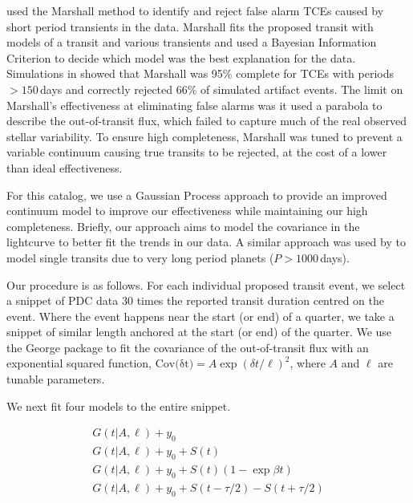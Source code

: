 
\citet{Coughlin2016} used the Marshall method \citep{Mullally16} to identify and reject false alarm TCEs caused by short period transients in the data. Marshall fits the proposed transit with models of a transit and various transients and used a Bayesian Information Criterion to decide which model was the best explanation for the data. Simulations in \citet{Mullally16} showed that Marshall was 95\% complete for TCEs with periods $>150$\,days and correctly rejected 66\% of simulated artifact events. The limit on Marshall's effectiveness at eliminating false alarms was it used a parabola to describe the out-of-transit flux, which failed to capture much of the real observed stellar variability. To ensure high completeness, Marshall was tuned to prevent a variable continuum causing true transits to be rejected, at the cost of a lower than ideal effectiveness.

For this catalog, we use a Gaussian Process approach \citep[GP][]{Rasmussen10} to provide an improved continuum model to improve our effectiveness while maintaining our high completeness. Briefly, our approach aims to model the covariance in the lightcurve to better fit the trends in our data.
A similar approach was used by \citet{ForemanMackey16} to model single transits due to very long period planets ($P > 1000$\,days).

Our procedure is as follows. For each individual proposed transit event, we select a snippet of PDC data 30 times the reported transit duration centred on the event. Where the event happens near the start (or end) of a quarter, we take a snippet of similar length anchored at the start (or end) of the quarter. We use the George package \citep{Ambikasaran14} to fit the covariance of the out-of-transit flux with an exponential squared function, $ {\mathrm{Cov(\delta t})} = A \exp{ (\delta t/\ell)^2}$, where $A$ and $\ell$ are tunable parameters. 

We next fit four models to the entire snippet.

\begin{equation}
\left.\begin{aligned}
G(t | A, \ell) + y_0 \\
G(t | A, \ell) + y_0 + S(t)\\
G(t | A, \ell) + y_0 + S(t)(1 - \exp{\beta t})\\
G(t | A, \ell) + y_0 + S(t - \tau/2) - S(t + \tau/2) 
\end{aligned}\right.
\end{equation}

